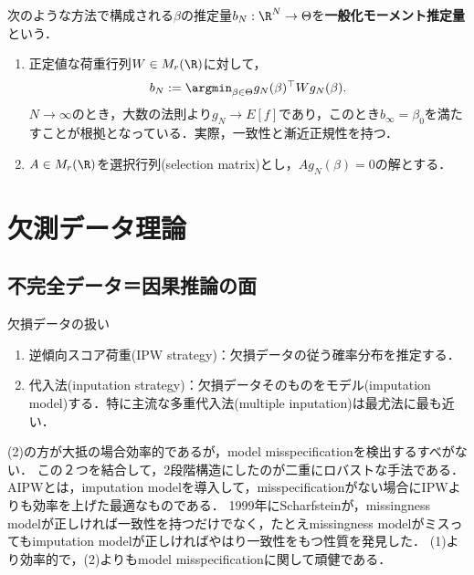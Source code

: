 \documentclass[uplatex,dvipdfmx]{jsreport}
\begin{document}
\begin{definition}
    次のような方法で構成される$\beta$の推定量$b_N:\R^N\to\Theta$を\textbf{一般化モーメント推定量}という．
    \begin{enumerate}
        \item 正定値な荷重行列$W\in M_r(\R)$に対して，
        \[b_N:=\argmin_{\beta\in\Theta}g_N(\beta)^\top Wg_N(\beta).\]
        $N\to\infty$のとき，大数の法則より$g_N\to E[f]$であり，このとき$b_\infty=\beta_0$を満たすことが根拠となっている．実際，一致性と漸近正規性を持つ．
        \item $A\in M_r(\R)$を選択行列(selection matrix)とし，$Ag_N(\beta)=0$の解とする．
    \end{enumerate}
\end{definition}

\section{欠測データ理論}

\subsection{不完全データ＝因果推論の面}

欠損データの扱い
\begin{enumerate}
    \item 逆傾向スコア荷重(IPW strategy)：欠損データの従う確率分布を推定する．
    \item 代入法(inputation strategy)：欠損データそのものをモデル(imputation model)する．特に主流な多重代入法(multiple inputation)は最尤法に最も近い．
\end{enumerate}
(2)の方が大抵の場合効率的であるが，model misspecificationを検出するすべがない．
この２つを結合して，2段階構造にしたのが二重にロバストな手法である．
AIPWとは，imputation modelを導入して，misspecificationがない場合にIPWよりも効率を上げた最適なものである．
1999年にScharfsteinが，missingness modelが正しければ一致性を持つだけでなく，たとえmissingness modelがミスってもimputation modelが正しければやはり一致性をもつ性質を発見した．
(1)より効率的で，(2)よりもmodel misspecificationに関して頑健である．
\end{document}
